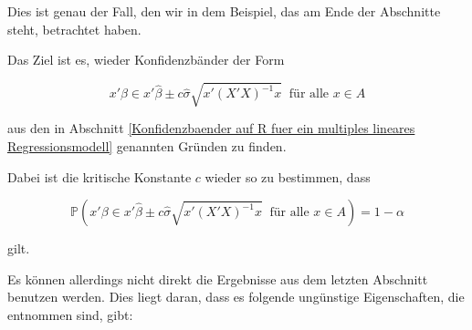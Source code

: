 \documentclass[12pt,a4paper]{article}
\theoremstyle{definition}
\theoremstyle{definition}
\theoremstyle{definition}
\theoremstyle{definition}
\begin{document}
Dies ist genau der Fall, den wir in dem Beispiel, das am Ende der Abschnitte steht, betrachtet haben. 

Das Ziel ist es, wieder Konfidenzbänder der Form 

\begin{equation}
x' \beta \in x' \hat{\beta} \pm c \hat{\sigma} \sqrt{x'(X'X)^{-1}x} ~ \text{ für alle } x \in A
\end{equation}

aus den in Abschnitt \ref{Konfidenzbaender auf R fuer ein multiples lineares Regressionsmodell} genannten Gründen zu  finden. 

Dabei ist die kritische Konstante $c$ wieder so zu bestimmen, dass

\begin{equation*}
\mathbb{P}(x' \beta \in x' \hat{\beta} \pm c \hat{\sigma} \sqrt{x'(X'X)^{-1}x} ~ \text{ für alle } x \in A) = 1 - \alpha
\end{equation*}

gilt. 

Es können allerdings nicht direkt die Ergebnisse aus dem letzten Abschnitt benutzen werden. Dies liegt daran, dass es  folgende ungünstige Eigenschaften, die \cite[180]{Liu64} entnommen sind, gibt: 
\end{document}
